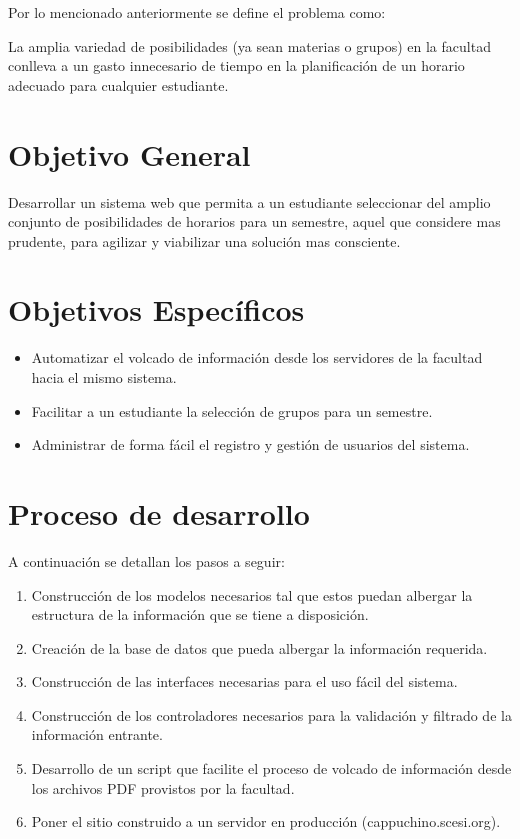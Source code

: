 \documentclass[letter,12pt]{article}
\begin{document}
Por lo mencionado anteriormente se define el problema como:

La amplia variedad de posibilidades (ya sean materias o grupos) en la facultad conlleva a un gasto
innecesario de tiempo en la planificación de un horario adecuado para cualquier estudiante.

\section{Objetivo General}
Desarrollar un sistema web que permita a un estudiante seleccionar del amplio conjunto de
posibilidades de horarios para un semestre, aquel que considere mas prudente, para agilizar
y viabilizar una solución mas consciente.

\section{Objetivos Específicos}
\begin{itemize}
\item Automatizar el volcado de información desde los servidores de la facultad hacia el mismo sistema.
\item Facilitar a un estudiante la selección de grupos para un semestre.
\item Administrar de forma fácil el registro y gestión de usuarios del sistema.
\end{itemize}

\section{Proceso de desarrollo}
A continuación se detallan los pasos a seguir:

\begin{enumerate}
\item Construcción de los modelos necesarios tal que estos puedan albergar la estructura de la
información que se tiene a disposición.
\item Creación de la base de datos que pueda albergar la información requerida.
\item Construcción de las interfaces necesarias para el uso fácil del sistema.
\item Construcción de los controladores necesarios para la validación y filtrado de la información
entrante.
\item Desarrollo de un script que facilite el proceso de volcado de información desde los archivos
PDF provistos por la facultad.
\item Poner el sitio construido a un servidor en producción (cappuchino.scesi.org).
\end{enumerate}
\end{document}
